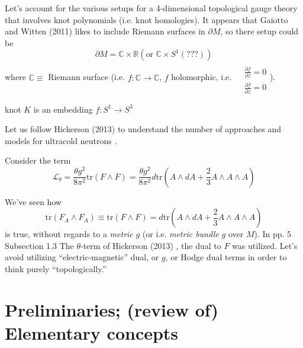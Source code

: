 \documentclass[10pt]{amsart}
\begin{document}
Let's account for the various setups for a 4-dimensional topological gauge theory that involves knot polynomials (i.e. knot homologies).  It appears that Gaiotto and Witten (2011) \cite{GW2011} likes to include Riemann surfaces in $\partial M$, so there setup could be
\[
\partial M = \mathbb{C} \times \mathbb{R} (\text{or } \mathbb{C}\times S^1 (???) )
\]
where $\mathbb{C} \equiv $ Riemann surface (i.e. $f:\mathbb{C} \to \mathbb{C}$, $f$ holomorphic, i.e. $\begin{aligned} & \quad \\
  & \frac{ \partial f}{ \partial \overline{z}} = 0 \\
  & \frac{ \partial \overline{f}}{ \partial z } = 0 \end{aligned}$).  


knot $K$ is an embedding $f: S^1 \to S^3$


Let us follow Hickerson (2013) \cite{Hick2013} to understand the number of approaches and models for ultracold neutrons \cite{Hick2013}.  

Consider the term
\[
\mathcal{L}_{\theta} = \frac{ \theta g^2}{ 8 \pi^2 } \text{tr}(F\wedge F) = \frac{ \theta g^2}{8 \pi^2} d\text{tr}( A \wedge dA + \frac{2}{3} A \wedge A \wedge A)
\]

We've seen how 
\begin{equation}
  \text{tr}(F_A \wedge F_A) \equiv \text{tr}(F\wedge F) = d\text{tr}(A \wedge dA + \frac{2}{3} A \wedge A \wedge A )
\end{equation}
is true, without regards to a \emph{metric} $g$ (or i.e. \emph{metric bundle} $g$ over $M$).  In pp. 5 Subsection 1.3 The $\theta$-term of Hickerson (2013) \cite{Hick2013}, the dual to $F$ was utilized.  Let's avoid utilizing ``electric-magnetic'' dual, or $g$, or Hodge dual terms in order to think purely ``topologically.''




\part{Preliminaries; (review of) Elementary concepts}
\end{document}

